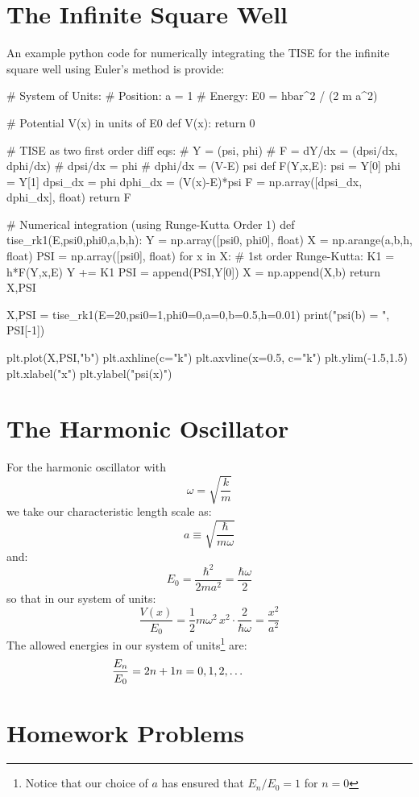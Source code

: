 \documentclass[12pt]{book}
\begin{document}
\section{The Infinite Square Well}
An example python code for numerically integrating the TISE for the infinite square well using Euler's method is provide:
\begin{python}
# System of Units:
# Position:  a = 1
# Energy:   E0 = hbar^2 / (2 m a^2)

# Potential V(x) in units of E0
def V(x):
    return 0

# TISE as two first order diff eqs:
# Y = (psi, phi)
# F = dY/dx = (dpsi/dx, dphi/dx)
# dpsi/dx = phi
# dphi/dx = (V-E) psi
def F(Y,x,E):
    psi = Y[0]
    phi = Y[1]
    dpsi_dx = phi
    dphi_dx = (V(x)-E)*psi
    F = np.array([dpsi_dx, dphi_dx], float)
    return F

# Numerical integration (using Runge-Kutta Order 1)
def tise_rk1(E,psi0,phi0,a,b,h):
    Y = np.array([psi0, phi0], float)
    X   = np.arange(a,b,h, float)
    PSI = np.array([psi0], float)
    for x in X:
        # 1st order Runge-Kutta:
        K1 = h*F(Y,x,E)
        Y += K1
        PSI = append(PSI,Y[0])
    X = np.append(X,b)
    return X,PSI

X,PSI = tise_rk1(E=20,psi0=1,phi0=0,a=0,b=0.5,h=0.01)
print("psi(b) = ", PSI[-1])

plt.plot(X,PSI,"b")
plt.axhline(c="k")
plt.axvline(x=0.5, c="k")
plt.ylim(-1.5,1.5)
plt.xlabel("x")
plt.ylabel("psi(x)")
\end{python}

\section{The Harmonic Oscillator}

For the harmonic oscillator with
\begin{equation*}
\omega = \sqrt{\frac{k}{m}}
\end{equation*}
we take our characteristic length scale as:
$$a \equiv \sqrt{\frac{\hbar}{m \omega}}$$
and:
$$E_0 = \frac{\hbar^2}{2ma^2} = \frac{\hbar \omega}{2}$$
so that in our system of units:
$$\frac{V(x)}{E_0} = \frac{1}{2}m\omega^2 \, x^2 \cdot \frac{2}{\hbar \omega} = \frac{x^2}{a^2}$$
The allowed energies in our system of units\footnote{Notice that our choice of $a$ has ensured that $E_n/E_0 = 1$ for $n=0$} are:
$$\frac{E_n}{E_0} = 2n+1  \hspace{2cm n=0,1,2,\ldots}$$

\section{Homework Problems}
\end{document}

